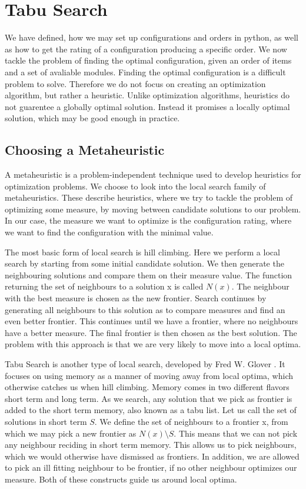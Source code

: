 \section{Tabu Search}
We have defined, how we may set up configurations and orders in python, as well as how to get the rating of a configuration producing a specific order. We now tackle the problem of finding the optimal configuration, given an order of items and a set of avaliable modules. Finding the optimal configuration is a difficult problem to solve. Therefore we do not focus on creating an optimization algorithm, but rather a heuristic. Unlike optimization algorithms, heuristics do not guarentee a globally optimal solution. Instead it promises a locally optimal solution, which may be good enough in practice.

\subsection{Choosing a Metaheuristic}
A metaheuristic is a problem-independent technique used to develop heuristics for optimization problems. We choose to look into the local search family of metaheuristics. These describe heuristics, where we try to tackle the problem of optimizing some measure, by moving between candidate solutions to our problem. In our case, the measure we want to optimize is the configuration rating, where we want to find the configuration with the minimal value.

The most basic form of local search is hill climbing. Here we perform a local search by starting from some initial candidate solution. We then generate the neighbouring solutions and compare them on their measure value. The function returning the set of neighbours to a solution x is called $N(x)$. The neighbour with the best measure is chosen as the new frontier. Search continues by generating all neighbours to this solution as to compare measures and find an even better frontier. This continues until we have a frontier, where no neighbours have a better measure. The final frontier is then chosen as the best solution. The problem with this approach is that we are very likely to move into a local optima. 

Tabu Search is another type of local search, developed by Fred W. Glover \cite{glover2006}. It focuses on using memory as a manner of moving away from local optima, which otherwise catches us when hill climbing. Memory comes in two different flavors short term and long term. As we search, any solution that we pick as frontier is added to the short term memory, also known as a tabu list. Let us call the set of solutions in short term $S$. We define the set of neighbours to a frontier x, from which we may pick a new frontier as $N(x) \setminus S$. This means that we can not pick any neighbour reciding in short term memory. This allows us to pick neighbours, which we would otherwise have dismissed as frontiers. In addition, we are allowed to pick an ill fitting neighbour to be frontier, if no other neighbour optimizes our measure. Both of these constructs guide us around local optima.

